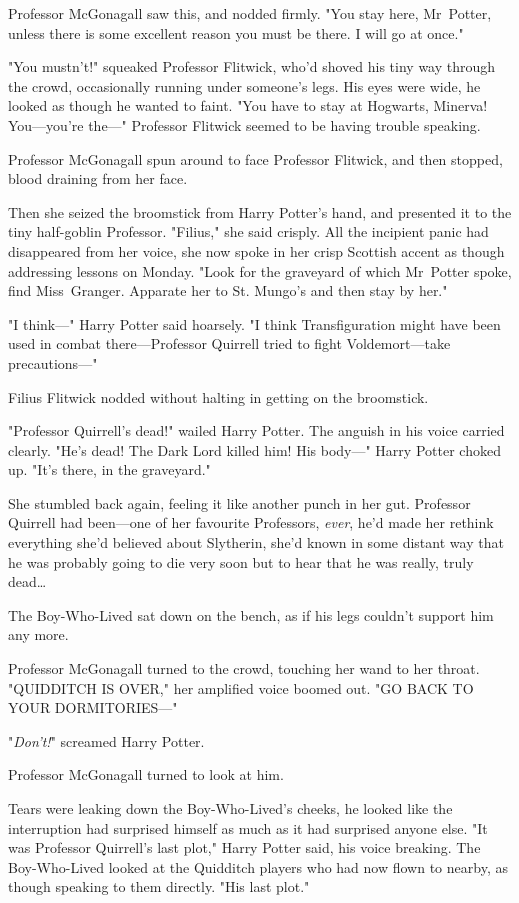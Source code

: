 Professor McGonagall saw this, and nodded firmly. "You stay here, Mr~Potter,
unless there is some excellent reason you must be there. I will go at once."

"You mustn't!" squeaked Professor Flitwick, who'd shoved his tiny way through
the crowd, occasionally running under someone's legs. His eyes were wide, he
looked as though he wanted to faint. "You have to stay at Hogwarts, Minerva!
You---you're the---" Professor Flitwick seemed to be having trouble speaking.

Professor McGonagall spun around to face Professor Flitwick, and then stopped,
blood draining from her face.

Then she seized the broomstick from Harry Potter's hand, and presented it to
the tiny half-goblin Professor. "Filius," she said crisply. All the incipient
panic had disappeared from her voice, she now spoke in her crisp Scottish
accent as though addressing lessons on Monday. "Look for the graveyard of which
Mr~Potter spoke, find Miss~Granger. Apparate her to St. Mungo's and then stay
by her."

"I think---" Harry Potter said hoarsely. "I think Transfiguration might have
been used in combat there---Professor Quirrell tried to fight Voldemort---take
precautions---"

Filius Flitwick nodded without halting in getting on the broomstick.

"Professor Quirrell's dead!" wailed Harry Potter. The anguish in his voice
carried clearly. "He's dead! The Dark Lord killed him! His body---" Harry
Potter choked up. "It's there, in the graveyard."

She stumbled back again, feeling it like another punch in her gut. Professor
Quirrell had been---one of her favourite Professors, \emph{ever}, he'd made her
rethink everything she'd believed about Slytherin, she'd known in some distant
way that he was probably going to die very soon but to hear that he was really,
truly dead{\ldots}

The Boy-Who-Lived sat down on the bench, as if his legs couldn't support him
any more.

Professor McGonagall turned to the crowd, touching her wand to her throat.
"QUIDDITCH IS OVER," her amplified voice boomed out. "GO BACK TO YOUR
DORMITORIES---"

"\emph{Don't!}" screamed Harry Potter.

Professor McGonagall turned to look at him.

Tears were leaking down the Boy-Who-Lived's cheeks, he looked like the
interruption had surprised himself as much as it had surprised anyone else. "It
was Professor Quirrell's last plot," Harry Potter said, his voice breaking. The
Boy-Who-Lived looked at the Quidditch players who had now flown to nearby, as
though speaking to them directly. "His last plot."

